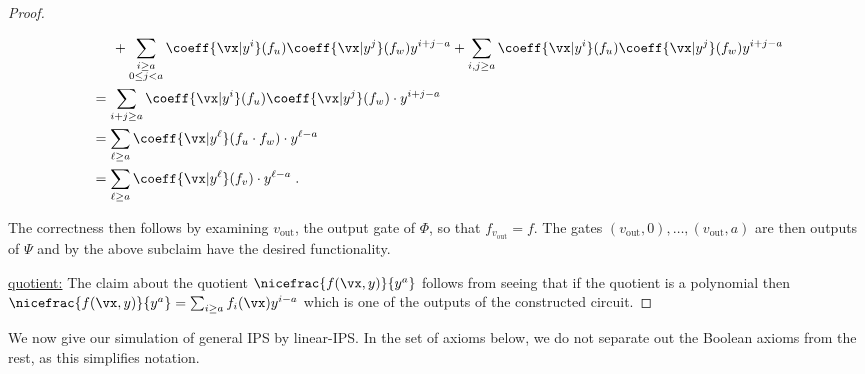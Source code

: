 \documentclass[11pt]{article}
\numberwithin{equation}{section}
\theoremstyle{definition}
\theoremstyle{plain}
\begin{document}
\begin{proof}
\begin{subproof}
\begin{itemize}
\begin{align*}
                                        &\hspace{.2in}+\sum_{\substack{i\ge a\\ 0\le j<a}}\coeff{\vx|y^i}(f_u)\coeff{\vx|y^j}(f_w) y^{i+j-a}
                                                +\sum_{i,j\ge a}\coeff{\vx|y^i}(f_u)\coeff{\vx|y^j}(f_w) y^{i+j-a}\\
                                        &=\sum_{i+j\ge a}\coeff{\vx|y^i}(f_u)\coeff{\vx|y^j}(f_w)\cdot y^{i+j-a}\\
                                        &=\sum_{\ell\ge a}\coeff{\vx|y^\ell}(f_u \cdot f_w)\cdot y^{\ell-a}\\
                                        &=\sum_{\ell\ge a}\coeff{\vx|y^\ell}(f_v)\cdot y^{\ell-a}
                                        \;.
                                        \qedhere
                                \end{align*}
                \end{itemize}
        \end{subproof}

        The correctness then follows by examining $v_\mathrm{out}$, the output gate of $\Phi$, so that $f_{v_\mathrm{out}}=f$.  The gates $(v_\mathrm{out},0),\ldots,(v_\mathrm{out},a)$ are then outputs of $\Psi$ and by the above subclaim have the desired functionality.

        \uline{quotient:} The claim about the quotient $\nicefrac{f(\vx,y)}{y^a}$ follows from seeing that if the quotient is a polynomial then $\nicefrac{f(\vx,y)}{y^a}=\sum_{i\ge a} f_i(\vx) y^{i-a}$ which is one of the outputs of the constructed circuit.
\end{proof}

We now give our simulation of general IPS by linear-IPS\@. In the
%
set of axioms below,   %
we do not separate out the Boolean axioms from the rest, as this simplifies notation.
\end{document}
